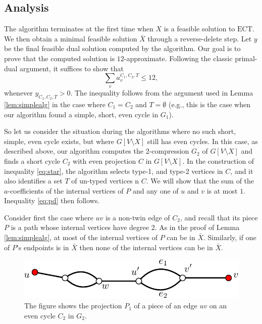 \documentclass{article}
\newcommand{\ect}{\ensuremath{\mbox{ECT}}}
\newcommand{\0}{\mathbb{0}}
\newcommand{\1}{\mathbb{1}}
\begin{document}
\subsection{Analysis}

The algorithm terminates at the first time when $X$ is a feasible solution to \ect. We
then obtain a minimal feasible solution $\bar{X}$ through a reverse-delete step. 
Let $y$ be the final feasible dual solution computed by the algorithm. 
Our goal is to prove that the computed solution is $12$-approximate. 
Following the classic primal-dual argument, it
suffices to show that
\begin{equation}\label{eq:pd}
\sum_{v} a^{C_1,C_2,T}_v \leq 12,
\end{equation}
whenever $y_{C_1,C_2,T}>0$. The inequality follows from the argument used in Lemma 
\ref{lem:simplealg} in the case where $C_1=C_2$ and $T=\emptyset$ (e.g., this is the case when our algorithm found a simple, short, even cycle in $G_1$).

So let us consider the situation during the algorithms where no such short, simple, even
cycle exists, but where $G[V\setminus X]$ still has even cycles. 
In this case, as described above, our algorithm computes the 2-compression $G_2$ of $G
[V\setminus X]$ and finds a short cycle $C_2$ with even projection $C$ in $G[V\setminus
X]$. In the construction of inequality \eqref{eq:star}, the algorithm selects 
type-1, and type-2 vertices in $C$, and it also identifies a set $T$ of un-typed vertices
n $C$. We will show that the sum of the $a$-coefficients of
the internal vertices of $P$ and any one of $u$ and $v$ is at most $1$. Inequality 
\eqref{eq:pd} then follows.  

Consider first the case where $uv$ is a non-twin edge of $C_2$, and recall that its
piece $P$ is a path whose internal vertices have degree $2$. As in the proof of Lemma 
\ref{lem:simplealg}, at most of the internal vertices of $P$ can be in $\bar{X}$.
Similarly, if
one of $P$'s endpoints is in $\bar{X}$ then none of the internal vertices can be in
$\bar{X}$.

\begin{figure}
  \begin{center}
    \includegraphics[width=.5\textwidth]{piece.pdf}
  \end{center}  
  \caption{\label{fig:piece} The figure shows the projection $P_1$ of a piece of an
  edge $uv$ on an even
  cycle $C_2$ in $G_2$.}
\end{figure}  
\end{document}
